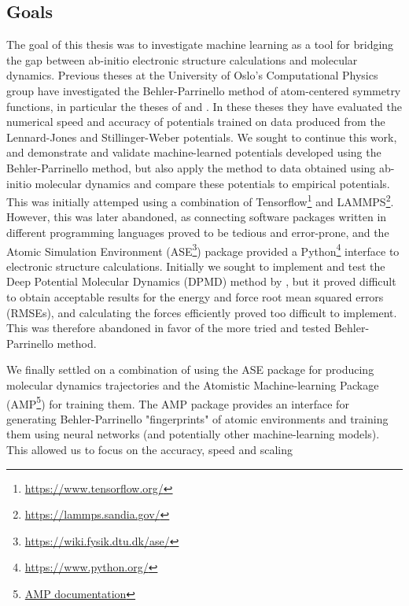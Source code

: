 \subsection{Goals}
The goal of this thesis was to investigate machine learning
as a tool for bridging the gap between ab-initio electronic structure
calculations and molecular dynamics. Previous theses at the University
of Oslo's Computational Physics group have investigated the Behler-Parrinello
\cite{behler2007generalized} method of atom-centered symmetry functions,
in particular the theses of
\parencite[Stende, John A,]{stende2017constructing} and
\parencite[Treider, H{\aa}kon Vik{\o}r]{treider2017speeding}.
In these theses they have evaluated the
numerical speed and accuracy of potentials trained on data
produced from the Lennard-Jones
and Stillinger-Weber potentials.
We sought to continue this work, and demonstrate and validate machine-learned
potentials developed using the Behler-Parrinello method, but also apply
the method to data obtained using ab-initio molecular dynamics
and compare these potentials to empirical potentials.
This was initially attemped using a combination of Tensorflow\footnote{
    \url{https://www.tensorflow.org/}} and LAMMPS\footnote{
    \url{https://lammps.sandia.gov/}}.
However, this was later abandoned, as connecting software packages written
in different programming languages proved to be tedious and error-prone,
and the Atomic Simulation Environment (ASE\footnote{
    \url{https://wiki.fysik.dtu.dk/ase/}}) package provided a Python\footnote{
    \url{https://www.python.org/}} 
interface to electronic structure calculations.
Initially we sought to implement and test the Deep Potential Molecular Dynamics
(DPMD) method by \parencite[Zhang et al.]{PhysRevLett.120.143001}, but
it proved difficult to obtain acceptable results for the energy
and force root mean squared errors (RMSEs), and calculating the forces
efficiently proved too difficult to implement. This was therefore abandoned
in favor of the more tried and tested Behler-Parrinello method.
\par
We finally settled on a combination of using the ASE package for producing
molecular dynamics trajectories and the Atomistic Machine-learning Package
(AMP\footnote{\href{https://amp.readthedocs.io/en/latest/}{AMP documentation}})
for training them.
The AMP package provides an interface
for generating Behler-Parrinello "fingerprints" of atomic environments
and training them using neural networks (and potentially other machine-learning
models). This allowed us to focus on the accuracy, speed and scaling
